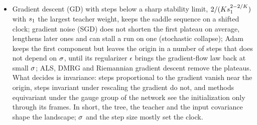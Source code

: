 \begin{itemize}[leftmargin=*,itemsep=2pt]
    floor.
  \item Gradient descent (GD) with steps below a sharp stability limit, $2/(Ks_{1}^{2-2/K})$ with $s_{1}$
    the largest teacher weight, keeps the saddle sequence on a shifted clock; gradient noise (SGD) does
    not shorten the first plateau on average, lengthens later ones and can stall a run on one (stochastic
    collapse); Adam keeps the first component but leaves the origin in a number of steps that does not
    depend on $\sigma$, until its regularizer $\epsilon$ brings the gradient-flow law back at small $\sigma$;
    ALS, DMRG and Riemannian gradient descent remove the plateaus. What decides is invariance: steps proportional to the gradient vanish near the
    origin, steps invariant under rescaling the gradient do not, and methods equivariant under the gauge
    group of the network see the initialization only through its frames. In short, the tree, the teacher
    and the input covariance shape the landscape; $\sigma$ and the step size mostly set the clock.
\end{itemize}

